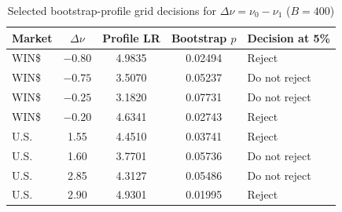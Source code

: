 \documentclass[11pt,a4paper]{article}
\theoremstyle{plain}
\theoremstyle{remark}
\begin{document}
\begin{table}[ht]
\centering\small
\caption{Selected bootstrap-profile grid decisions for $\Delta\nu=\nu_0-\nu_1$ ($B=400$)}\label{tab:prof}
\begin{tabular}{lcccl}
\toprule
Market & $\Delta\nu$ & Profile LR & Bootstrap $p$ & Decision at 5\%\\
\midrule
WIN\$ & $-0.80$ & 4.9835 & 0.02494 & Reject\\
WIN\$ & $-0.75$ & 3.5070 & 0.05237 & Do not reject\\
WIN\$ & $-0.25$ & 3.1820 & 0.07731 & Do not reject\\
WIN\$ & $-0.20$ & 4.6341 & 0.02743 & Reject\\
U.S. & 1.55 & 4.4510 & 0.03741 & Reject\\
U.S. & 1.60 & 3.7701 & 0.05736 & Do not reject\\
U.S. & 2.85 & 4.3127 & 0.05486 & Do not reject\\
U.S. & 2.90 & 4.9301 & 0.01995 & Reject\\
\bottomrule
\end{tabular}
\end{table}
\end{document}
